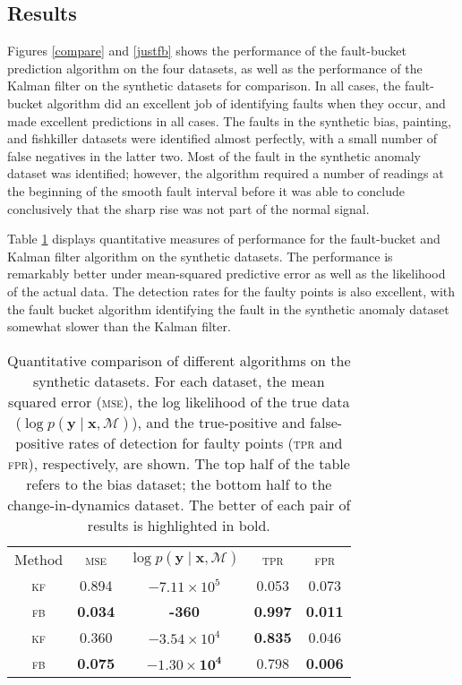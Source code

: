 \documentclass{article}
\newcommand{\given}{\ensuremath{\mid}}
\newcommand{\cm}[1]{\ensuremath{\mathcal{#1}}}
\newcommand{\bm}[1]{\ensuremath{\mathbf{#1}}}
\begin{document}
\subsection{Results}
Figures \ref{compare} and \ref{justfb} shows the performance of the
fault-bucket prediction algorithm on the four datasets, as well as the
performance of the Kalman filter on the synthetic datasets for
comparison.  In all cases, the fault-bucket algorithm did an excellent
job of identifying faults when they occur, and made excellent
predictions in all cases.  The faults in the synthetic bias, painting,
and fishkiller datasets were identified almost perfectly, with a small
number of false negatives in the latter two.  Most of the fault in the
synthetic anomaly dataset was identified; however, the algorithm
required a number of readings at the beginning of the smooth fault
interval before it was able to conclude conclusively that the sharp
rise was not part of the normal signal.

Table \ref{tbl:results} displays quantitative measures of performance
for the fault-bucket and Kalman filter algorithm on the synthetic
datasets.  The performance is remarkably better under mean-squared
predictive error as well as the likelihood of the actual data.  The
detection rates for the faulty points is also excellent, with the
fault bucket algorithm identifying the fault in the synthetic anomaly
dataset somewhat slower than the Kalman filter.

\begin{table}
  \centering
  \caption{Quantitative comparison of different algorithms on the
    synthetic datasets.  For each dataset, the mean squared error
    (\textsc{mse}), the log likelihood of the true data ($\log p(\bm{y}
    \given \bm{x}, \cm{M})$), and the true-positive and false-positive rates
    of detection for faulty points (\textsc{tpr} and \textsc{fpr}),
    respectively, are shown.  The top half of the table refers to the
    bias dataset; the bottom half to the change-in-dynamics
    dataset. The better of each pair of results is highlighted in
    bold.}
  \label{tbl:results}
  \begin{tabular}{ccccc}
    \toprule
    Method & \scshape{mse} & $\log p(\bm{y} \given \bm{x}, \cm{M})$ & \scshape{tpr} & \scshape{fpr} \\
    \cmidrule{1-1} \cmidrule(l){2-5} 
    \scshape{kf} & 0.894 & $-7.11 \times 10^5$ & 0.053 & 0.073 \\
    \scshape{fb} & \textbf{0.034} & \textbf{-360} & \textbf{0.997} & \textbf{0.011} \\
    \midrule
    \scshape{kf} & 0.360 & $-3.54 \times 10^4$ & \textbf{0.835} & 0.046 \\
    \scshape{fb} & \textbf{0.075} & $\mathbf{-1.30 \times 10^4}$ & 0.798 & \textbf{0.006} \\
    \bottomrule
  \end{tabular}
\end{table}
\end{document}
